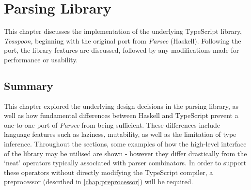 \chapter{Parsing Library}
\label{chap:library}

This chapter discusses the implementation of the underlying TypeScript library, \textit{Teaspoon}, beginning with the original port from \textit{Parsec} (Haskell).
Following the port, the library features are discussed, followed by any modifications made for performance or usability.





\section*{Summary}
This chapter explored the underlying design decisions in the parsing library, as well as how fundamental differences between Haskell and TypeScript prevent a one-to-one port of \textit{Parsec} from being sufficient.
These differences include language features such as laziness, mutability, as well as the limitation of type inference.
Throughout the sections, some examples of how the high-level interface of the library may be utilised are shown - however they differ drastically from the `neat' operators typically associated with parser combinators.
In order to support these operators without directly modifying the TypeScript compiler, a preprocessor (described in \autoref{chap:preprocessor}) will be required.
